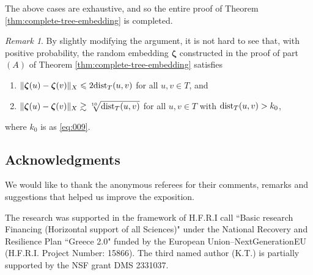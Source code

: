\documentclass[11pt,leqno]{amsart}
\theoremstyle{remark}
\newtheorem{remark}[theorem]{Remark}
\theoremstyle{plain}
\def\dist{{\rm dist}}
\def\dist{{\rm dist}}
\begin{document}
The above cases are exhaustive, and so the entire proof of Theorem \ref{thm:complete-tree-embedding} is completed.

\begin{remark}
By slightly modifying the argument, it is not hard to see that, with positive probability,
the random embedding $\boldsymbol{\zeta}$ constructed in the proof of part $(A)$ of
Theorem \ref{thm:complete-tree-embedding} satisfies
\begin{enumerate}
\item[$\bullet$] $\|\boldsymbol{\zeta}(u)- \boldsymbol{\zeta}(v)\|_X \leqslant 2 \dist_T(u,v)$
for all $u,v\in T$, and
\item[$\bullet$] $\|\boldsymbol{\zeta}(u)- \boldsymbol{\zeta}(v)\|_X \gtrsim \sqrt[10]{\dist_T(u,v)}$
for all $u,v\in T$ with $\dist_T(u,v)>k_0$,
\end{enumerate}
where $k_0$ is as \eqref{eq:009}.
\end{remark}

\subsection*{Acknowledgments}

We would like to thank the anonymous referees for their comments, remarks and suggestions that helped us improve the exposition.

The research was supported in the framework of H.F.R.I call ``Basic research Financing (Horizontal support of all Sciences)" under the National Recovery and Resilience Plan ``Greece 2.0" funded by the European Union--NextGenerationEU (H.F.R.I. Project Number: 15866). The third named author (K.T.) is partially supported by the NSF grant DMS 2331037.
\end{document}
